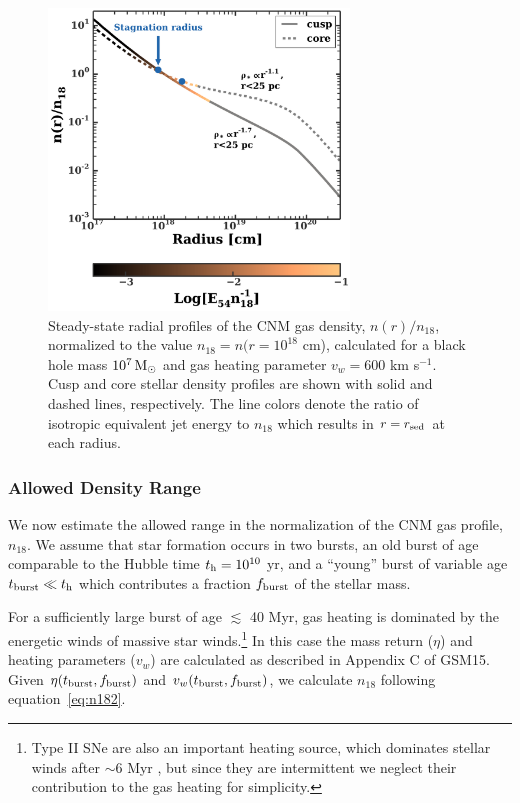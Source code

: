 \documentclass[usenatbib,fleqn]{mnras}
\newcommand{\Msun}{{\rm M_\odot}}
\begin{document}
\begin{figure}
\includegraphics[width=8cm]{sedov_radius.pdf}
\caption{\label{fig:profiles} Steady-state radial profiles of the CNM
  gas density, $n(r)/n_{18}$, normalized to the value $n_{18} = n(r =
  10^{18}$ cm), calculated for a black hole mass $10^{7} \,\Msun$ and
  gas heating parameter $v_w=600$ km s$^{-1}$.  Cusp and core stellar
  density profiles are shown with solid and dashed lines,
  respectively.  The line colors denote the ratio of isotropic
  equivalent jet energy to $n_{18}$ which results in $r = r_{\rm sed}$
  at each radius.}
\end{figure}



\subsubsection{Allowed Density Range}
\label{sec:densAllowed}

We now estimate the allowed range in the normalization of the CNM gas profile, $n_{18}$.  We assume that star formation
occurs in two bursts, an old burst of age comparable to the Hubble
time $t_{\rm h} = 10^{10}$ yr, and a ``young'' burst of variable age
$t_{\rm burst} \ll t_{\rm h}$ which contributes a fraction $f_{\rm
  burst}$ of the stellar mass.

For a sufficiently large burst of age $\lesssim$ 40 Myr, gas
heating is dominated by the energetic winds of massive star
winds.\footnote{Type II SNe are also an important heating
  source, which dominates stellar winds after $\sim$6 Myr
  \citep{Voss+2009}, but since they are intermittent we neglect their
  contribution to the gas heating for simplicity.}  In
this case the mass return ($\eta$) and heating parameters ($v_w$) are
calculated as described in Appendix C of GSM15.  Given
$\eta(t_{\rm burst},f_{\rm burst})$ and $v_w(t_{\rm burst},f_{\rm
  burst})$, we calculate $n_{18}$ following equation~\eqref{eq:n182}.
\end{document}
